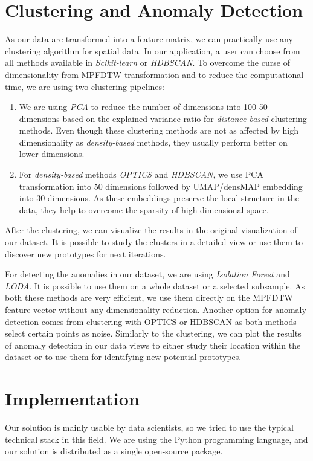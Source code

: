 \section{Clustering and Anomaly Detection}
As our data are transformed into a feature matrix, we can practically use any clustering algorithm for spatial data. In our application, a user can choose from all methods available in \textit{Scikit-learn} or \textit{HDBSCAN}. To overcome the curse of dimensionality from MPFDTW transformation and to reduce the computational time, we are using two clustering pipelines:
\begin{enumerate}
    \item We are using \textit{PCA} to reduce the number of dimensions into 100-50 dimensions based on the explained variance ratio for \textit{distance-based} clustering methods. Even though these clustering methods are not as affected by high dimensionality as \textit{density-based} methods, they usually perform better on lower dimensions.
    \item For \textit{density-based} methods \textit{OPTICS} and \textit{HDBSCAN}, we use PCA transformation into 50 dimensions followed by UMAP/densMAP embedding into 30 dimensions. As these embeddings preserve the local structure in the data, they help to overcome the sparsity of high-dimensional space.
\end{enumerate}

After the clustering, we can visualize the results in the original visualization of our dataset. It is possible to study the clusters in a detailed view or use them to discover new prototypes for next iterations.

For detecting the anomalies in our dataset, we are using \textit{Isolation Forest} and \textit{LODA}. It is possible to use them on a whole dataset or a selected subsample. As both these methods are very efficient, we use them directly on the MPFDTW feature vector without any dimensionality reduction. Another option for anomaly detection comes from clustering with OPTICS or HDBSCAN as both methods select certain points as noise. Similarly to the clustering, we can plot the results of anomaly detection in our data views to either study their location within the dataset or to use them for identifying new potential prototypes.


\section{Implementation}
Our solution is mainly usable by data scientists, so we tried to use the typical technical stack in this field. We are using the Python programming language, and our solution is distributed as a single open-source package.

